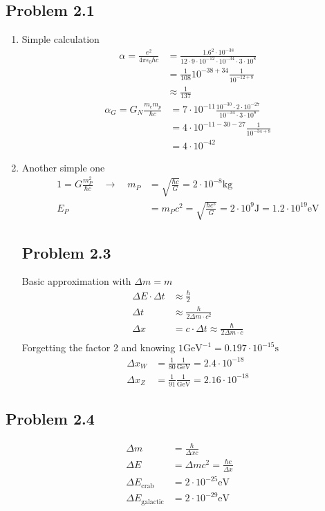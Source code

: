 \documentclass[10pt,a4paper]{book}
\theoremstyle{definition}
\begin{document}
\subsection{Problem 2.1}
\begin{enumerate}
\item Simple calculation
\begin{align}
\alpha=\frac{e^2}{4\pi\epsilon_0\hbar c}&=\frac{1.6^2\cdot 10^{-38}}{12\cdot 9\cdot 10^{-12}\cdot 10^{-34}\cdot3\cdot10^8}\\
&=\frac{1}{108}10^{-38+34}\frac{1}{10^{-12+8}}\\
&\approx\frac{1}{137}
\end{align}
\begin{align}
\alpha_G=G_N\frac{m_em_p}{\hbar c}&=7\cdot10^{-11}\frac{10^{-30}\cdot2\cdot10^{-27}}{10^{-34}\cdot3\cdot10^8}\\
&=4\cdot10^{-11-30-27}\frac{1}{10^{-34+8}}\\
&=4\cdot10^{-42}
\end{align}
\item Another simple one
\begin{align}
1=G\frac{m_P^2}{\hbar c}\quad\rightarrow\quad m_P&=\sqrt{\frac{\hbar c}{G}}=2\cdot10^{-8}\text{kg}\\
E_P&=m_Pc^2=\sqrt{\frac{\hbar c^5}{G}}=2\cdot10^9\text{J}=1.2\cdot10^{19}\text{eV}
\end{align}

\subsection{Problem 2.3}
Basic approximation with $\Delta m = m$
\begin{align}
\Delta E\cdot\Delta t&\approx\frac{\hbar}{2}\\
\Delta t&\approx\frac{\hbar}{2\Delta m\cdot c^2}\\
\Delta x&=c\cdot\Delta t\approx\frac{\hbar}{2\Delta m\cdot c}\\
\end{align}
Forgetting the factor 2 and knowing $1\text{GeV}^{-1}= 0.197\cdot10^{-15}\text{s}$
\begin{align}
\Delta x_W&=\frac{1}{80}\frac{1}{\text{GeV}}=2.4\cdot10^{-18}\\
\Delta x_Z&=\frac{1}{91}\frac{1}{\text{GeV}}=2.16\cdot10^{-18}
\end{align}
\end{enumerate}

\subsection{Problem 2.4}
\begin{align}
\Delta m &= \frac{\hbar}{\Delta x c}\\
\Delta E &= \Delta m c^2=\frac{\hbar c}{\Delta x}\\
\Delta E_\text{crab}&=2\cdot10^{-25}\text{eV}\\
\Delta E_\text{galactic}&=2\cdot10^{-29}\text{eV}
\end{align}
\end{document}
